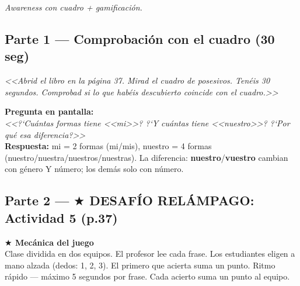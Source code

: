 \documentclass[a4paper,10pt]{article}
\newcommand{\pos}[1]{\textbf{\textcolor{purpura}{#1}}}
\begin{document}
\vspace{0.2cm}

\textit{Awareness con cuadro + gamificaci\'on.}

\vspace{0.5cm}


\subsection*{\textcolor{purpura}{Parte 1 --- Comprobaci\'on con el cuadro (30 seg)}}

\begin{tcolorbox}[colback=gris, colframe=purpura!50, arc=3pt, boxrule=0.5pt]
\textit{<<Abrid el libro en la p\'agina 37. Mirad el cuadro de posesivos. Ten\'eis 30 segundos. Comprobad si lo que hab\'eis descubierto coincide con el cuadro.>>}
\end{tcolorbox}

\vspace{0.3cm}

\begin{awarenessbox}
\textbf{Pregunta en pantalla:}\\[0.2cm]
\textit{<<?`Cu\'antas formas tiene <<mi>>? ?`Y cu\'antas tiene <<nuestro>>? ?`Por qu\'e esa diferencia?>>}\\[0.2cm]
\textbf{Respuesta:} mi = 2 formas (mi/mis), nuestro = 4 formas (nuestro/nuestra/nuestros/nuestras). La diferencia: \pos{nuestro}/\pos{vuestro} cambian con g\'enero Y n\'umero; los dem\'as solo con n\'umero.
\end{awarenessbox}

\vspace{0.5cm}


\subsection*{\textcolor{purpura}{Parte 2 --- $\bigstar$ DESAF\'IO REL\'AMPAGO: Actividad 5 (p.37)}}

\begin{gamebox}
\textbf{\textcolor{dorado!80!black}{$\bigstar$ Mec\'anica del juego}}\\[0.2cm]
Clase dividida en dos equipos. El profesor lee cada frase. Los estudiantes eligen a mano alzada (dedos: 1, 2, 3). El primero que acierta suma un punto. Ritmo r\'apido --- m\'aximo 5 segundos por frase. Cada acierto suma un punto al equipo.
\end{gamebox}
\end{document}
